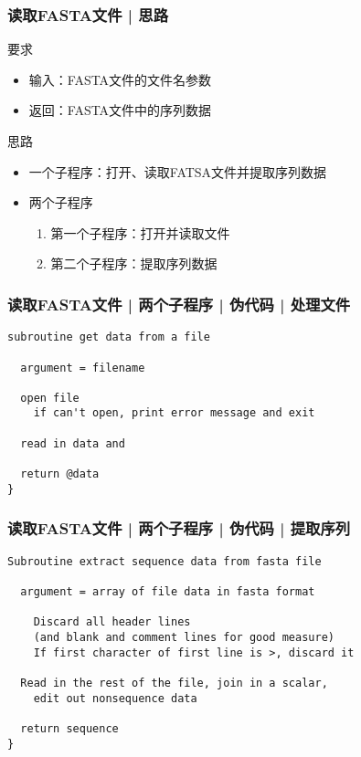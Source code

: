 \begin{frame}
  \frametitle{读取FASTA文件 | 思路}
  \begin{block}{要求}
    \begin{itemize}
      \item 输入：FASTA文件的文件名参数
      \item 返回：FASTA文件中的序列数据
    \end{itemize}
  \end{block}
  \pause
  \begin{block}{思路}
    \begin{itemize}
      \item 一个子程序：打开、读取FATSA文件并提取序列数据
      \item 两个子程序
	\begin{enumerate}
	  \item 第一个子程序：打开并读取文件
	  \item 第二个子程序：提取序列数据
	\end{enumerate}
    \end{itemize}
  \end{block}
\end{frame}

\begin{frame}[fragile]
  \frametitle{读取FASTA文件 | 两个子程序 | 伪代码 | 处理文件}
\begin{lstlisting}
subroutine get data from a file

  argument = filename

  open file
    if can't open, print error message and exit

  read in data and 

  return @data
}
\end{lstlisting}
\end{frame}

\begin{frame}[fragile]
  \frametitle{读取FASTA文件 | 两个子程序 | 伪代码 | 提取序列}
\begin{lstlisting}[basicstyle=\small\tt]
Subroutine extract sequence data from fasta file

  argument = array of file data in fasta format

    Discard all header lines
    (and blank and comment lines for good measure)
    If first character of first line is >, discard it

  Read in the rest of the file, join in a scalar,
    edit out nonsequence data

  return sequence
}
\end{lstlisting}
\end{frame}

